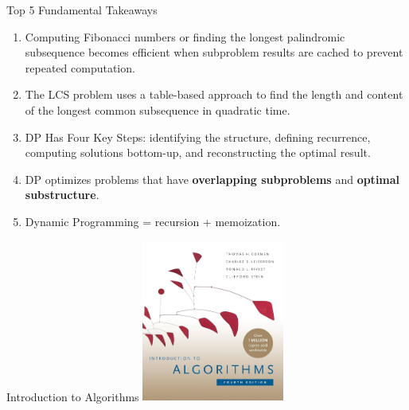 \documentclass[aspectratio=169]{beamer}
\begin{document}
\begin{frame}{Top 5 Fundamental Takeaways}
    \small
    \begin{enumerate} \pause

        \item[5] Computing Fibonacci numbers or finding the longest palindromic subsequence becomes efficient when subproblem results are cached to prevent repeated computation. \pause

        \item[4] The LCS problem uses a table-based approach to find the length and content of the longest common subsequence in quadratic time. \pause

        \item[3] DP Has Four Key Steps: identifying the structure, defining recurrence, computing solutions bottom-up, and reconstructing the optimal result. \pause

        \item[2] DP optimizes problems that have \textbf{overlapping subproblems} and \textbf{optimal substructure}. \pause

        \item[1] Dynamic Programming = recursion + memoization.
    \end{enumerate}
\end{frame}

\begin{frame}{Introduction to Algorithms}
    \centering
    \includegraphics[width=0.35\textwidth]{figures/book_cover.jpg} \\
\end{frame}
\end{document}
